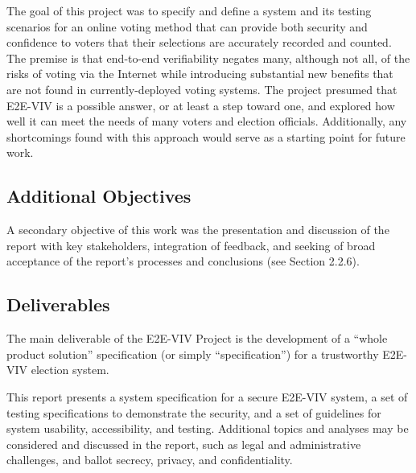 The goal of this project was to specify and define a system and its
testing scenarios for an online voting method that can provide both
security and confidence to voters that their selections are accurately
recorded and counted. The premise is that end-to-end verifiability
negates many, although not all, of the risks of voting via the
Internet while introducing substantial new benefits that are not found
in currently-deployed voting systems. The project presumed that
E2E-VIV is a possible answer, or at least a step toward one, and
explored how well it can meet the needs of many voters and election
officials. Additionally, any shortcomings found with this approach
would serve as a starting point for future work.

\subsection{Additional Objectives}
\label{sec:addit-object}

A secondary objective of this work was the presentation and discussion
of the report with key stakeholders, integration of feedback, and
seeking of broad acceptance of the report's processes and conclusions
(see Section 2.2.6).

\subsection{Deliverables}
\label{sec:deliverables}

The main deliverable of the E2E-VIV Project is the development of a
``whole product solution'' specification (or simply ``specification'')
for a trustworthy E2E-VIV election system.

This report presents a system specification for a secure E2E-VIV
system, a set of testing specifications to demonstrate the security,
and a set of guidelines for system usability, accessibility, and
testing. Additional topics and analyses may be considered and
discussed in the report, such as legal and administrative challenges,
and ballot secrecy, privacy, and confidentiality.

